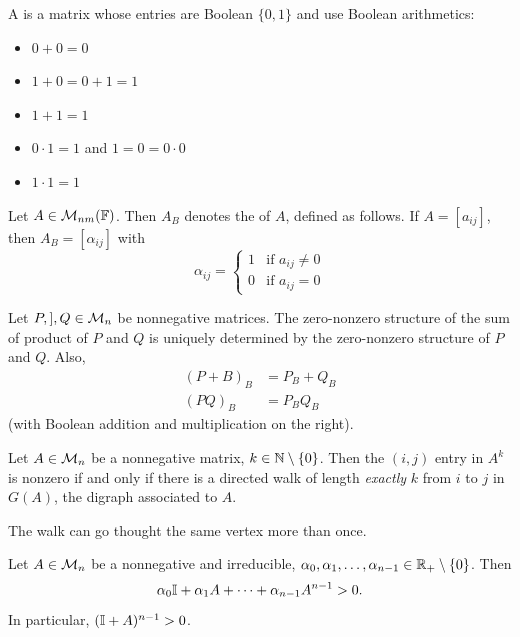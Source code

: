 \documentclass[aspectratio=169]{beamer}
\begin{document}
\begin{frame}
\begin{definition}
A  is a matrix whose entries are Boolean $\{0,1\}$ and use Boolean arithmetics:
\begin{itemize}
    \item $0+0=0$
    \item $1+0=0+1=1$
    \item $1+1=1$
    \item $0\cdot 1= 1$ and $ 1= 0= 0\cdot 0$
    \item $1\cdot 1=1$
\end{itemize}
\end{definition}
\begin{definition} 
Let $A\in \mathcal{M}_{nm}(\mathbb{F})$.
Then $A_B$ denotes the  of $A$, defined as follows. If $A=[a_{ij}]$, then $A_B=[\alpha_{ij}]$ with
\[
\alpha_{ij} = 
\begin{cases}
1& \textrm{if }a_{ij}\neq 0\\
0& \textrm{if }a_{ij}=0
\end{cases}
\]
\end{definition}

\begin{theorem}
Let $P,], Q\in \mathcal{M}_{n}$ be nonnegative matrices. The zero-nonzero structure of the sum of product of $P$ and $Q$ is uniquely determined by the zero-nonzero structure of $P$ and $Q$. Also,
\begin{align*}
    (P+B)_B &= P_B+Q_B\\
    (PQ)_B& = P_BQ_B
\end{align*}
 (with Boolean addition and multiplication on the right).
\end{theorem}

\begin{theorem}\label{th:aij_positive_path_length_k}
Let $A\in \mathcal{M}_n$ be a nonnegative matrix, $k\in \mathbb{N}\setminus\{0\}$. Then the $(i,j)$ entry in $A^k$ is nonzero if and only if there is a directed walk of length \emph{exactly} $k$ from $i$ to $j$ in $G(A)$, the digraph associated to $A$.
\end{theorem}
\begin{remark}
The walk can go thought the same vertex more than once.
\end{remark}

\begin{theorem}\label{th:sum_of_irreducible_matrices_positive}
Let $A\in \mathcal{M}_n$ be a nonnegative and irreducible, $\alpha_0, \alpha_1, \ldots, \alpha_{n-1}\in \mathbb{R}_{+}\setminus\{0\}$. Then 
\[
\alpha_0\mathbb{I}+\alpha_1A+\cdots+ \alpha_{n-1}A^{n-1}>0.
\]
In particular, $(\mathbb{I}+A)^{n-1}>0$.
\end{theorem}



\end{frame}
\end{document}
